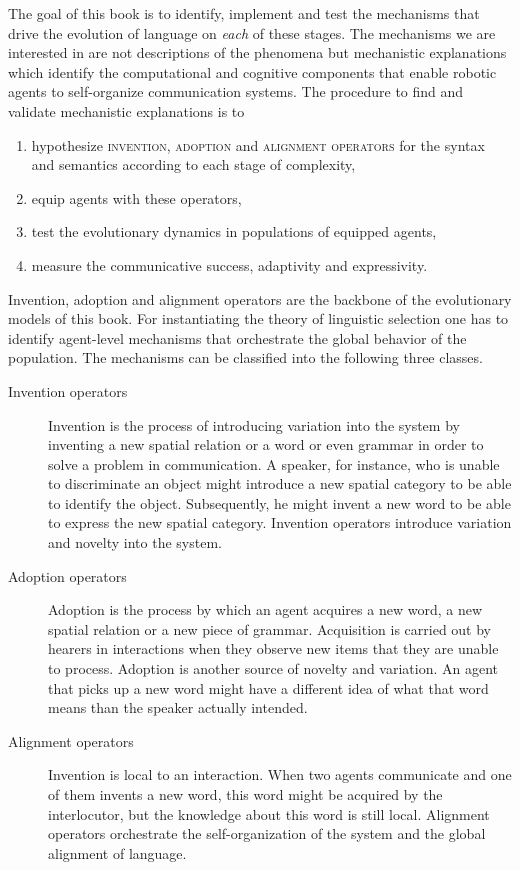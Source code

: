 The goal of this book is to identify, implement and test the mechanisms that drive 
the evolution of language on \emph{each} of these stages. The mechanisms 
we are interested in are not descriptions of the phenomena but mechanistic explanations 
which identify the computational and cognitive components
that enable robotic agents to self-organize communication systems.
The procedure to find and validate mechanistic explanations is to
\begin{enumerate} 
\item hypothesize \textsc{invention}, \textsc{adoption} and \textsc{alignment} \textsc{operators} for the syntax and semantics
according to each stage of complexity,
\item equip agents with these operators,
\item test the evolutionary dynamics in populations of equipped agents,
\item measure the communicative success, adaptivity and expressivity.
\end{enumerate}
Invention, adoption and alignment operators are the backbone of the evolutionary models 
of this book. For instantiating the theory of linguistic selection one has to identify 
agent-level mechanisms that orchestrate the global behavior of the population. The mechanisms 
can be classified into the following three classes.
\begin{description}
\item[Invention operators] Invention is the process of introducing variation 
into the system by inventing a new spatial relation or a word or even grammar
in order to solve a problem in communication. A speaker, for instance,
who is unable to discriminate an object might introduce a new spatial
category to be able to identify the object. Subsequently, he might invent
a new word to be able to express the new spatial category.
Invention operators introduce variation and novelty into the system.
\item[Adoption operators] Adoption is the process by which an
agent acquires a new word, a new spatial relation or a new piece of grammar.
Acquisition is carried out by hearers in interactions when they observe
new items that they are unable to process.
Adoption is another source of novelty and variation. An agent that
picks up a new word might have a different idea of what that word
means than the speaker actually intended. 
\item[Alignment operators] Invention is local to an interaction. When two
agents communicate and one of them invents a new word, this word
might be acquired by the interlocutor, but the knowledge about this 
word is still local. Alignment operators orchestrate the self-organization
of the system and the global alignment of language.
\end{description}


